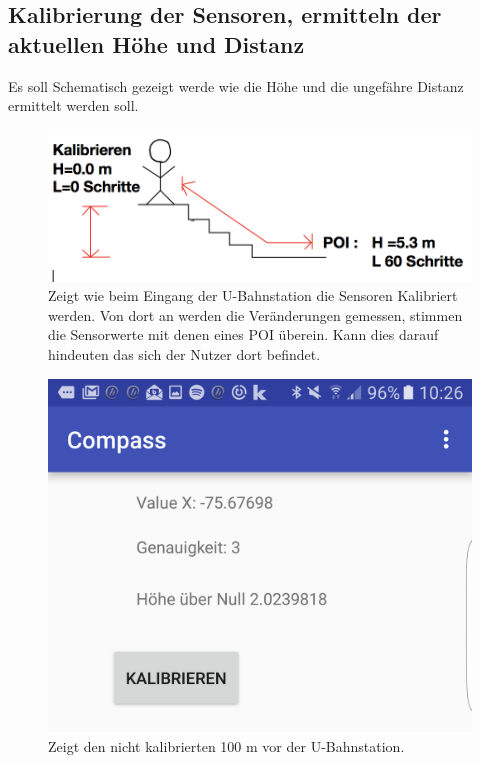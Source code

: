 \documentclass{article}
\begin{document}
\subsection*{Kalibrierung der Sensoren, ermitteln der aktuellen Höhe und Distanz}
Es soll Schematisch gezeigt werde wie die Höhe und die ungefähre Distanz ermittelt werden soll.
\begin{figure}[H]
	\centering
	\includegraphics[scale=0.60]{images/skizze-calibration.png}
	\caption{Zeigt wie beim Eingang der U-Bahnstation die Sensoren Kalibriert werden. Von dort an werden die Veränderungen gemessen, stimmen die Sensorwerte mit denen eines POI überein. Kann dies darauf hindeuten das sich der Nutzer dort befindet.}
	\label{fig:skizze-calibration.png}
	
\end{figure}
\begin{figure}[H]
	\centering
	\includegraphics[scale=0.18]{images/app_pic1_calibration.png}
	\caption{Zeigt den  nicht kalibrierten 100 m vor der U-Bahnstation.}
	\label{fig:app_pic1_calibration.png}
\end{figure}
\end{document}
